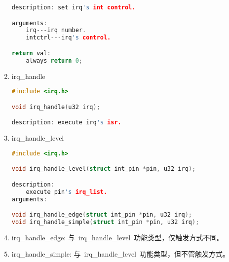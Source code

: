 \begin{enumerate}
\begin{lstlisting}[language=c, numbers=none]
description: set irq's int control.

arguments:
	irq---irq number.
	intctrl---irq's control.

return val:
	always return 0;
\end{lstlisting}

\item irq\_handle
\begin{lstlisting}[language=c, numbers=none]
#include <irq.h>

void irq_handle(u32 irq);

description: execute irq's isr.
\end{lstlisting}

\item irq\_handle\_level
\begin{lstlisting}[language=c, numbers=none]
#include <irq.h>

void irq_handle_level(struct int_pin *pin, u32 irq);

description:
	execute pin's irq_list.
arguments:

void irq_handle_edge(struct int_pin *pin, u32 irq);
void irq_handle_simple(struct int_pin *pin, u32 irq);
\end{lstlisting}
\item irq\_handle\_edge: 与~irq\_handle\_level~功能类型，仅触发方式不同。
\item irq\_handle\_simple: 与~irq\_handle\_level~功能类型，但不管触发方式。
\end{enumerate}

